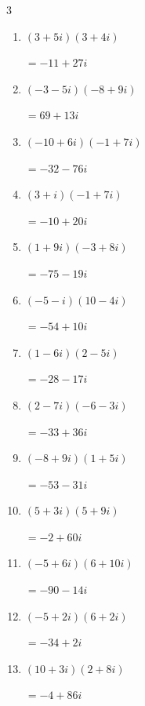 \begin{multicols}{3}
\begin{enumerate}
        $\displaystyle =55-56i$

  \item $\displaystyle (3+5i)(3+4i)$

        $\displaystyle =-11+27i$

  \item $\displaystyle (-3-5i)(-8+9i)$

        $\displaystyle =69+13i$

  \item $\displaystyle (-10+6i)(-1+7i)$

        $\displaystyle =-32-76i$

\columnbreak %

  \item $\displaystyle (3+i)(-1+7i)$

        $\displaystyle =-10+20i$

  \item $\displaystyle (1+9i)(-3+8i)$

        $\displaystyle =-75-19i$

  \item $\displaystyle (-5-i)(10-4i)$

        $\displaystyle =-54+10i$

  \item $\displaystyle (1-6i)(2-5i)$

        $\displaystyle =-28-17i$

  \item $\displaystyle (2-7i)(-6-3i)$

        $\displaystyle =-33+36i$

  \item $\displaystyle (-8+9i)(1+5i)$

        $\displaystyle =-53-31i$

  \item $\displaystyle (5+3i)(5+9i)$

        $\displaystyle =-2+60i$

  \item $\displaystyle (-5+6i)(6+10i)$

        $\displaystyle =-90-14i$

  \item $\displaystyle (-5+2i)(6+2i)$

        $\displaystyle =-34+2i$

  \item $\displaystyle (10+3i)(2+8i)$

        $\displaystyle =-4+86i$


\end{enumerate}
\end{multicols}

